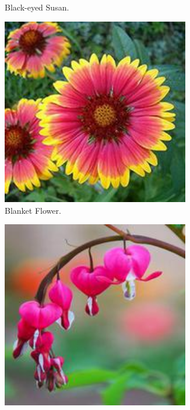\begin{figure}
\begin{subfigure}{0.24\textwidth}
        \caption{Black-eyed Susan.}
    \end{subfigure}
    \begin{subfigure}{0.24\textwidth}
        \centering
        \includegraphics[width=0.9\textwidth]{../example_images/BlanketFlower.jpg}
        \caption{Blanket Flower.}
    \end{subfigure}
    \begin{subfigure}{0.24\textwidth}
        \centering
        \includegraphics[width=0.9\textwidth]{../example_images/BleedingHeart.jpg}

\end{subfigure}
\end{figure}
